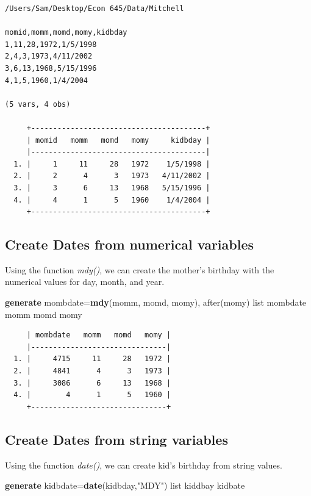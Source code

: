 \documentclass[
]{book}
\newenvironment{Shaded}{\begin{snugshade}}{\end{snugshade}}
\newcommand{\FunctionTok}[1]{\textcolor[rgb]{0.13,0.29,0.53}{\textbf{#1}}}
\newcommand{\KeywordTok}[1]{\textcolor[rgb]{0.13,0.29,0.53}{\textbf{#1}}}
\newcommand{\NormalTok}[1]{#1}
\newcommand{\OtherTok}[1]{\textcolor[rgb]{0.56,0.35,0.01}{#1}}
\newcommand{\StringTok}[1]{\textcolor[rgb]{0.31,0.60,0.02}{#1}}
\begin{document}
\begin{verbatim}
/Users/Sam/Desktop/Econ 645/Data/Mitchell

momid,momm,momd,momy,kidbday
1,11,28,1972,1/5/1998
2,4,3,1973,4/11/2002
3,6,13,1968,5/15/1996
4,1,5,1960,1/4/2004

(5 vars, 4 obs)

     +----------------------------------------+
     | momid   momm   momd   momy     kidbday |
     |----------------------------------------|
  1. |     1     11     28   1972    1/5/1998 |
  2. |     2      4      3   1973   4/11/2002 |
  3. |     3      6     13   1968   5/15/1996 |
  4. |     4      1      5   1960    1/4/2004 |
     +----------------------------------------+
\end{verbatim}

\subsection{Create Dates from numerical variables}\label{create-dates-from-numerical-variables}

Using the function \emph{mdy()}, we can create the mother's birthday with the numerical values for day, month, and year.

\begin{Shaded}
\begin{Highlighting}[]
\KeywordTok{generate}\NormalTok{ mombdate=}\FunctionTok{mdy}\NormalTok{(momm, momd, momy), after(momy)}
\OtherTok{list}\NormalTok{ mombdate momm momd momy }
\end{Highlighting}
\end{Shaded}

\begin{verbatim}
     | mombdate   momm   momd   momy |
     |-------------------------------|
  1. |     4715     11     28   1972 |
  2. |     4841      4      3   1973 |
  3. |     3086      6     13   1968 |
  4. |        4      1      5   1960 |
     +-------------------------------+
\end{verbatim}

\subsection{Create Dates from string variables}\label{create-dates-from-string-variables}

Using the function \emph{date()}, we can create kid's birthday from string values.

\begin{Shaded}
\begin{Highlighting}[]
\KeywordTok{generate}\NormalTok{ kidbdate=}\FunctionTok{date}\NormalTok{(kidbday,}\StringTok{"MDY"}\NormalTok{)}
\OtherTok{list}\NormalTok{ kiddbay kidbate }
\end{Highlighting}
\end{Shaded}
\end{document}
